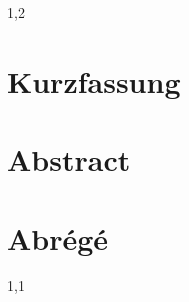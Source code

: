 \documentclass[11pt,a4paper,twoside]{article}
\begin{document}
\begin{spacing}{1,2}
\newpage



\thispagestyle{empty}
 \section*{Kurzfassung}

 \section*{Abstract}

 \section*{Abrégé}
 \newpage


\end{spacing}
\begin{spacing}{1,1}
\tableofcontents\newpage

\end{spacing}
\end{document}
